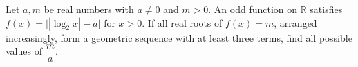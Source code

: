 Let $a,m$ be real numbers with $a\ne0$ and $m>0$. An odd function on $\mathbb R$ satisfies $f(x)=\bigl||\log_2x|-a\bigr|$ for $x>0$. If all real roots of $f(x)=m$, arranged increasingly, form a geometric sequence with at least three terms, find all possible values of $\dfrac{m}{a}$.
